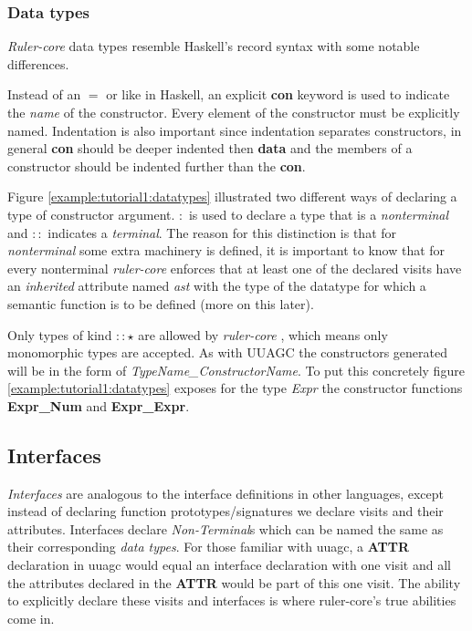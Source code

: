 \documentclass[twoside, titlepage, openright, a4paper]{book}
\newcommand{\rcore}{\emph{ruler-core }}
\newcommand{\Rcore}{\emph{Ruler-core }}
\begin{document}
\subsubsection{Data types}
\Rcore data types resemble Haskell's record syntax with some notable differences.

Instead of an $=$ or \textbar \space like in Haskell, an explicit \textbf{con} keyword is used to indicate the \emph{name} of the constructor. Every element of the constructor must be explicitly named. Indentation is also important since indentation separates constructors, in general \textbf{con} should be deeper indented then \textbf{data} and the members of a constructor should be indented further than the \textbf{con}. 

Figure \ref{example:tutorial1:datatypes} illustrated two different ways of declaring a type of constructor argument. $:$ is used to declare a type that is a \emph{nonterminal} and $::$ indicates a \emph{terminal}. The reason for this distinction is that for \emph{nonterminal} some extra machinery is defined, it is important to know that for every nonterminal \rcore enforces that at least one of the declared visits have an \emph{inherited} attribute named \emph{ast} with the type of the datatype for which a semantic function is to be defined (more on this later).

Only types of kind $:: \star$ are allowed by \rcore, which means only monomorphic types are accepted. As with UUAGC the constructors generated will be in the form of \emph{TypeName\_ConstructorName}. To put this concretely figure \ref{example:tutorial1:datatypes} exposes for the type \emph{Expr} the constructor functions \textbf{Expr\_Num} and \textbf{Expr\_Expr}.

\subsection{Interfaces}
\emph{Interfaces} are analogous to the interface definitions in other languages, except instead of declaring function prototypes/signatures we declare visits and their attributes. Interfaces declare \emph{Non-Terminal}s which can be named the same as their corresponding \emph{data types}. For those familiar with uuagc, a \textbf{ATTR} declaration in uuagc would equal an interface declaration with one visit and all the attributes declared in the \textbf{ATTR} would be part of this one visit. The ability to explicitly declare these visits and interfaces is where ruler-core's true abilities come in.
\end{document}

